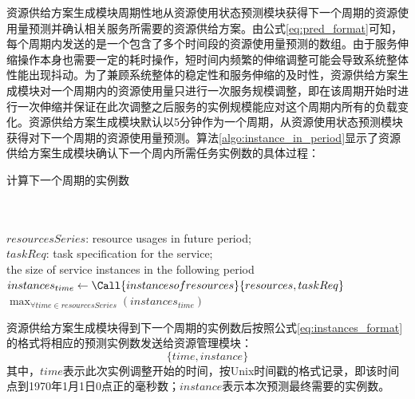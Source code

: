 资源供给方案生成模块周期性地从资源使用状态预测模块获得下一个周期的资源使用量预测并确认相关服务所需要的资源供给方案。由公式\ref{eq:pred_format}可知，每个周期内发送的是一个包含了多个时间段的资源使用量预测的数组。由于服务伸缩操作本身也需要一定的耗时操作，短时间内频繁的伸缩调整可能会导致系统整体性能出现抖动。为了兼顾系统整体的稳定性和服务伸缩的及时性，资源供给方案生成模块对一个周期内的资源使用量只进行一次服务规模调整，即在该周期开始时进行一次伸缩并保证在此次调整之后服务的实例规模能应对这个周期内所有的负载变化。资源供给方案生成模块默认以5分钟作为一个周期，从资源使用状态预测模块获得对下一个周期的资源使用量预测。算法\ref{algo:instance_in_period}显示了资源供给方案生成模块确认下一个周内所需任务实例数的具体过程：
\begin{algorithm}[H]
\caption{计算下一个周期的实例数}
\label{algo:instance_in_period}
\begin{algorithmic}[0]
\\
\Require ~~\
\\
$resourcesSeries$: resource usages in future period;\\
$taskReq$: task specification for the service;
\Ensure ~~\
\\
the size of service instances in the following period\\

    \State $instances_{time} \gets \Call{instancesofresources}{{resources}, {taskReq}}$
\EndFor
\State \Return $\max_{\forall time \in resourcesSeries} {(instances_{time})}$
\end{algorithmic}
\end{algorithm}

资源供给方案生成模块得到下一个周期的实例数后按照公式\ref{eq:instances_format}的格式将相应的预测实例数发送给资源管理模块：
\begin{equation}\label{eq:instances_format}
\{time, instance\}
\end{equation}
其中，$time$表示此次实例调整开始的时间，按Unix时间戳的格式记录，即该时间点到1970年1月1日0点正的毫秒数；$instance$表示本次预测最终需要的实例数。

